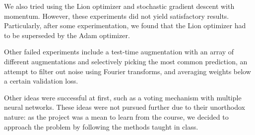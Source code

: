 \documentclass[11pt]{article}
\begin{document}
\begin{multicols}{2}
      We also tried using the Lion optimizer and stochastic gradient descent
      with momentum. However, these	experiments did not yield satisfactory
      results. Particularly, after some experimentation, we found
      that the Lion optimizer had to be superseded by the Adam optimizer.

      Other failed experiments include a test-time augmentation with an array
      of different augmentations and selectively picking the most common
      prediction, an attempt to filter out noise using Fourier transforms, and
      averaging weights below a certain validation loss.

      Other ideas were successful at first, such as a voting mechanism with
      multiple neural networks. These ideas were not pursued further due to
      their unorthodox nature: as the project was a mean to learn from the
      course, we decided to approach the problem by following the methods
      taught in class.




\end{multicols}
\end{document}
